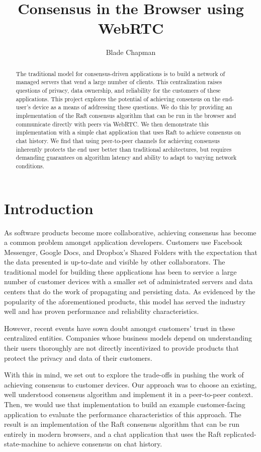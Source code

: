 \documentclass[11pt,twocolumn]{article}
\title{Consensus in the Browser using WebRTC}
\author{Blade Chapman}
\date{}
\begin{document}
\maketitle

\begin{abstract}
The traditional model for consensus-driven applications is to build a network of managed servers that vend a large number of clients. This centralization raises questions of privacy, data ownership, and reliability for the customers of these applications. This project explores the potential of achieving consensus on the end-user’s device as a means of addressing these questions. We do this by providing an implementation of the Raft consensus algorithm that can be run in the browser and communicate directly with peers via WebRTC. We then demonstrate this implementation with a simple chat application that uses Raft to achieve consensus on chat history. We find that using peer-to-peer channels for achieving consensus inherently protects the end user better than traditional architectures, but requires demanding guarantees on algorithm latency and ability to adapt to varying network conditions.\\
\end{abstract}

\section{Introduction}
As software products become more collaborative, achieving consensus has become a common problem amongst application developers. Customers use Facebook Messenger, Google Docs, and Dropbox's Shared Folders with the expectation that the data presented is up-to-date and visible by other collaborators. The traditional model for building these applications has been to service a large number of customer devices with a smaller set of administrated servers and data centers that do the work of propagating and persisting data. As evidenced by the popularity of the aforementioned products, this model has served the industry well and has proven performance and reliability characteristics.

However, recent events have sown doubt amongst customers' trust in these centralized entities. Companies whose business models depend on understanding their users thoroughly are not directly incentivized to provide products that protect the privacy and data of their customers.

With this in mind, we set out to explore the trade-offs in pushing the work of achieving consensus to customer devices. Our approach was to choose an existing, well understood consensus algorithm and implement it in a peer-to-peer context. Then, we would use that implementation to build an example customer-facing application to evaluate the performance characteristics of this approach. The result is an implementation of the Raft \cite{raftpaper} consensus algorithm that can be run entirely in modern browsers, and a chat application that uses the Raft replicated-state-machine to achieve consensus on chat history.
\end{document}
